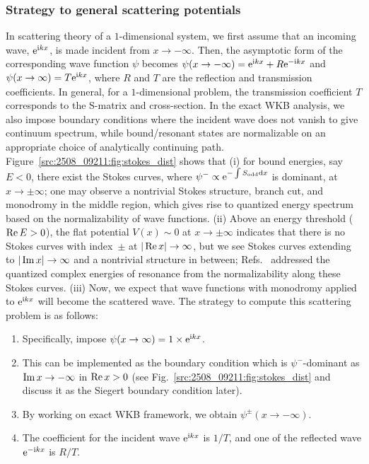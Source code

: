 \subsubsection{Strategy to general scattering potentials}
In scattering theory of a $1$-dimensional system, we first assume that an incoming wave, $\mathrm{e}^{\mathrm{i} kx}$, is made incident from $x\to-\infty$. Then, the asymptotic form of the corresponding wave function $\psi$ becomes $\psi(x\to-\infty) = \mathrm{e}^{\mathrm{i} kx} + R \mathrm{e}^{-\mathrm{i} kx}$ and $\psi(x\to\infty) = T \mathrm{e}^{\mathrm{i} kx}$, where $R$ and $T$ are the reflection and transmission coefficients. In general, for a $1$-dimensional problem, the transmission coefficient $T$ corresponds to the S-matrix and cross-section.
In the exact WKB analysis, we also impose boundary conditions where the incident wave does not vanish to give continuum spectrum, while bound/resonant states are normalizable on an appropriate choice of analytically continuing path. Figure~\ref{src:2508_09211:fig:stokes_dist} shows that (i) for bound energies, say $E<0$, there exist the Stokes curves, where $\psi^{-}\propto \mathrm{e}^{-\int S_{\mathrm{odd}}\mathrm{d} x}$ is dominant, at $x\to\pm\infty$; one may observe a nontrivial Stokes structure, branch cut, and monodromy in the middle region, which gives rise to quantized energy spectrum based on the normalizability of wave functions.
(ii) Above an energy threshold ($\operatorname{Re} E>0$), the flat potential $V(x)\sim 0$ at $x\to\pm\infty$ indicates that there is no Stokes curves with index~$\pm$ at $|\operatorname{Re} x|\to\infty$, but we see Stokes curves extending to $|\operatorname{Im} x|\to\infty$ and a nontrivial structure in between; Refs.~\cite{Morikawa:2025grx,Morikawa:2025xjq} addressed the quantized complex energies of resonance from the normalizability along these Stokes curves. (iii) Now, we expect that wave functions with monodromy applied to $\mathrm{e}^{\mathrm{i} kx}$ will become the scattered wave.
The strategy to compute this scattering problem is as follows:
\begin{enumerate}
    \item Specifically, impose $\psi(x\to\infty) = 1 \times \mathrm{e}^{\mathrm{i} kx}$.
    \item This can be implemented as the boundary condition which is $\psi^{-}$-dominant as $\operatorname{Im} x\to-\infty$ in $\operatorname{Re} x>0$ (see Fig.~\ref{src:2508_09211:fig:stokes_dist} and discuss it as the Siegert boundary condition later).
    \item By working on exact WKB framework, we obtain $\psi^{\pm}(x\to-\infty)$.
    \item The coefficient for the incident wave $\mathrm{e}^{\mathrm{i} kx}$ is $1/T$, and one of the reflected wave $\mathrm{e}^{-\mathrm{i} kx}$ is $R/T$.
\end{enumerate}
